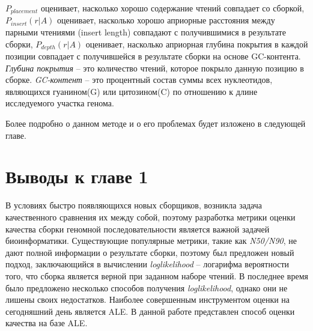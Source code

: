 $P_{placement}$ оценивает, насколько хорошо содержание чтений совпадает со сборкой, $P_{insert}(r|A)$ оценивает, насколько хорошо 
априорные расстояния между парными чтениями (insert length) совпадают с получившимися в результате сборки, $P_{depth}(r|A)$ оценивает, насколько априорная глубина покрытия в каждой позиции совпадает с получившейся в результате сборки на основе GC-контента. \textit{Глубина покрытия} – это количество чтений, которое покрыло данную позицию в сборке. \textit{GC-контент} – это процентный состав суммы всех нуклеотидов, являющихся гуанином(G) или цитозином(C) по отношению к длине исследуемого участка генома.

Более подробно о данном методе и о его проблемах будет изложено в следующей главе.

\section{Выводы к главе 1}
В условиях быстро появляющихся новых сборщиков, возникла задача качественного сравнения их между собой, поэтому разработка метрики оценки качества сборки геномной последовательности является важной задачей биоинформатики. Существующие популярные метрики, такие как \textit{N50/N90}, не дают полной информации о результате сборки, поэтому был предложен новый подход, заключающийся в вычислении \textit{loglikelihood} -- логарифма вероятности того, что сборка является верной при заданном наборе чтений.
В последнее время было предложено несколько способов получения \textit{loglikelihood}, однако они не лишены своих недостатков. Наиболее совершенным инструментом оценки на сегодняшний день является ALE. В данной работе представлен способ оценки качества на базе ALE.